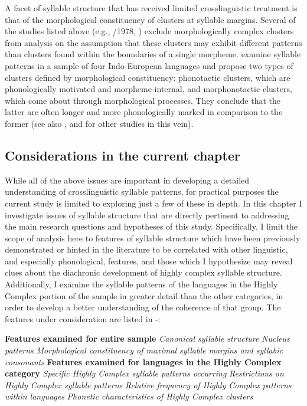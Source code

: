   A facet of syllable structure that has received limited crosslinguistic treatment is that of the morphological constituency of clusters at syllable margins. Several of the studies listed above (e.g., \citealt{Greenberg1965}/1978, \citealt{Morelli1999,Kreitman2008}) exclude morphologically complex clusters from analysis on the assumption that these clusters may exhibit different patterns than clusters found within the boundaries of a single morpheme. \citet{DresslerDziubalska-Kołaczyk2006} examine syllable patterns in a sample of four Indo-European languages and propose two types of clusters defined by morphological constituency: phonotactic clusters, which are phonologically motivated and morpheme-internal, and morphonotactic clusters, which come about through morphological processes. They conclude that the latter are often longer and more phonologically marked in comparison to the former (see also \citealt{DresslerEtAl2010,Orzechowska2012}, and \citealt{DresslerEtAl2015} for other studies in this vein).

\subsection{Considerations in the current chapter}\label{sec:3.1.2}

  While all of the above issues are important in developing a detailed understanding of crosslinguistic syllable patterns, for practical purposes the current study is limited to exploring just a few of these in depth. In this chapter I investigate issues of syllable structure that are directly pertinent to addressing the main research questions and hypotheses of this study. Specifically, I limit the scope of analysis here to features of syllable structure which have been previously demonstrated or hinted in the literature to be correlated with other linguistic, and especially phonological, features, and those which I hypothesize may reveal clues about the diachronic development of highly complex syllable structure. Additionally, I examine the syllable patterns of the languages in the Highly Complex portion of the sample in greater detail than the other categories, in order to develop a better understanding of the coherence of that group. The features under consideration are listed in -:

\ea\label{ex:3.1}
   \textbf{Features examined for entire sample}
\ea   \textit{Canonical syllable structure}
\ex   \textit{Nucleus patterns}
\ex   \textit{Morphological constituency of maximal syllable margins and syllabic consonants}
\z
\z
\ea\label{ex:3.2}
   \textbf{Features examined for languages in the Highly Complex category}
\ea   \textit{Specific Highly Complex syllable patterns occurring}
\ex   \textit{Restrictions on Highly Complex syllable patterns}
\ex   \textit{Relative frequency of Highly Complex patterns within languages}
\ex   \textit{Phonetic characteristics of Highly Complex clusters}
\z
\z

